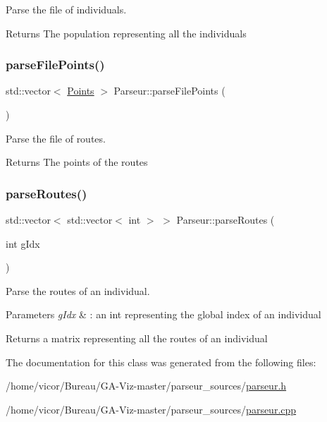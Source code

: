 Parse the file of individuals. 

\begin{DoxyReturn}{Returns}
The population representing all the individuals 
\end{DoxyReturn}
\mbox{\label{class_parseur_a67a68af11c904e1e7edd96db89517172}} 
\subsubsection{\texorpdfstring{parse\+File\+Points()}{parseFilePoints()}}
{\footnotesize\ttfamily std\+::vector$<$ \hyperlink{class_points}{Points} $>$ Parseur\+::parse\+File\+Points (\begin{DoxyParamCaption}{ }\end{DoxyParamCaption})}



Parse the file of routes. 

\begin{DoxyReturn}{Returns}
The points of the routes 
\end{DoxyReturn}
\mbox{\label{class_parseur_adc549ca4704a806fd3837091845fc24a}} 
\subsubsection{\texorpdfstring{parse\+Routes()}{parseRoutes()}}
{\footnotesize\ttfamily std\+::vector$<$ std\+::vector$<$ int $>$ $>$ Parseur\+::parse\+Routes (\begin{DoxyParamCaption}\item[{int}]{g\+Idx }\end{DoxyParamCaption})}



Parse the routes of an individual. 


\begin{DoxyParams}{Parameters}
{\em g\+Idx} & \+: an int representing the global index of an individual \\
\hline
\end{DoxyParams}
\begin{DoxyReturn}{Returns}
a matrix representing all the routes of an individual 
\end{DoxyReturn}


The documentation for this class was generated from the following files\+:\begin{DoxyCompactItemize}
\item 
/home/vicor/\+Bureau/\+G\+A-\/\+Viz-\/master/parseur\+\_\+sources/\hyperlink{parseur_8h}{parseur.\+h}\item 
/home/vicor/\+Bureau/\+G\+A-\/\+Viz-\/master/parseur\+\_\+sources/\hyperlink{parseur_8cpp}{parseur.\+cpp}\end{DoxyCompactItemize}
